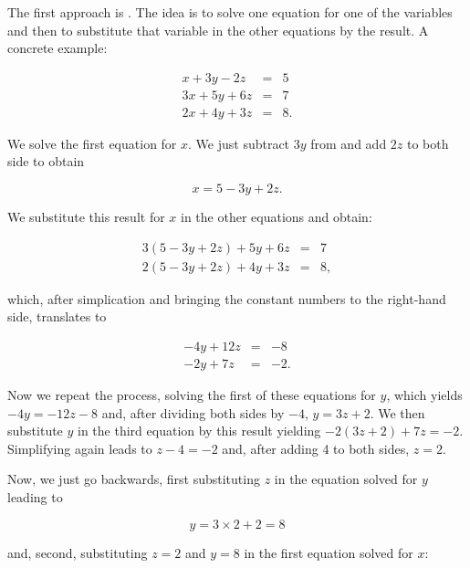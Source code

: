 \documentclass[tikz]{scrreprt}
\begin{document}
The first approach is . The idea is
to solve one equation for one of the variables and then
to substitute that variable in the other equations by
the result. A concrete example:

\begin{equation}
\begin{array}{lcl}
 x + 3y - 2z & = &  5\\
3x + 5y + 6z & = &  7\\
2x + 4y + 3z & = &  8.
\end{array}
\end{equation}

We solve the first equation for $x$.
We just subtract $3y$ from and add $2z$ to both side
to obtain

\begin{equation}
x = 5 - 3y + 2z.
\end{equation}

We substitute this result for $x$ in the other equations
and obtain:

\begin{equation}
\begin{array}{lcl}
3(5-3y+2z) + 5y + 6z & = &  7\\
2(5-3y+2z) + 4y + 3z & = &  8,
\end{array}
\end{equation}

which, after simplication and bringing the constant
numbers to the right-hand side, translates to

\begin{equation}
\begin{array}{lcl}
-4y+12z & = & -8\\
-2y+7z & = &  -2.
\end{array}
\end{equation}

Now we repeat the process, solving the first of these equations
for $y$, which yields $-4y = -12z-8$ and, after dividing
both sides by $-4$, $y=3z+2$. We then substitute $y$
in the third equation by this result yielding $-2(3z+2) + 7z = -2$.
Simplifying again leads to $z-4=-2$ and, after adding 4 to both sides,
$z=2$.

Now, we just go backwards, first 
substituting $z$ in the equation solved for $y$ leading to

\begin{equation}
y=3\times 2 + 2 = 8
\end{equation}

and, second, substituting $z=2$ and $y=8$ in the first equation
solved for $x$:
\end{document}
